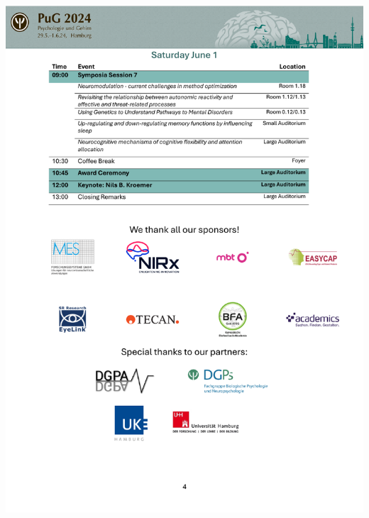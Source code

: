     \begin{center}
		\includegraphics[width=1\textwidth]{tex/images/programme_overview/Sat.pdf}
	\end{center}
		
	\newpage